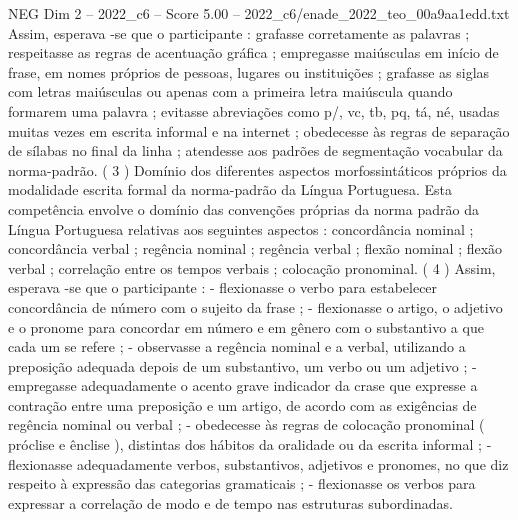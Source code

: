 \begin{textsample}{NEG Dim 2 – 2022\_c6 – Score 5.00 – 2022\_c6/enade\_2022\_teo\_00a9aa1edd.txt}
Assim, esperava -se que o participante : grafasse corretamente as palavras ; respeitasse as regras de acentuação gráfica ; empregasse maiúsculas em início de frase, em nomes próprios de pessoas, lugares ou instituições ; grafasse as siglas com letras maiúsculas ou apenas com a primeira letra maiúscula quando formarem uma palavra ; evitasse abreviações como p/, vc, tb, pq, tá, né, usadas muitas vezes em escrita informal e na internet ; obedecesse às regras de separação de sílabas no final da linha ; atendesse aos padrões de segmentação vocabular da norma-padrão. ( 3 ) Domínio dos diferentes aspectos morfossintáticos próprios da modalidade escrita formal da norma-padrão da Língua Portuguesa.
Esta competência envolve o domínio das convenções próprias da norma padrão da Língua Portuguesa relativas aos seguintes aspectos : concordância nominal ; concordância verbal ; regência nominal ; regência verbal ; flexão nominal ; flexão verbal ; correlação entre os tempos verbais ; colocação pronominal. ( 4 ) Assim, esperava -se que o participante : - flexionasse o verbo para estabelecer concordância de número com o sujeito da frase ; - flexionasse o artigo, o adjetivo e o pronome para concordar em número e em gênero com o substantivo a que cada um se refere ; - observasse a regência nominal e a verbal, utilizando a preposição adequada depois de um substantivo, um verbo ou um adjetivo ; - empregasse adequadamente o acento grave indicador da crase que expresse a contração entre uma preposição e um artigo, de acordo com as exigências de regência nominal ou verbal ; - obedecesse às regras de colocação pronominal ( próclise e ênclise ), distintas dos hábitos da oralidade ou da escrita informal ; - flexionasse adequadamente verbos, substantivos, adjetivos e pronomes, no que diz respeito à expressão das categorias gramaticais ; - flexionasse os verbos para expressar a correlação de modo e de tempo nas estruturas subordinadas.

\end{textsample}
